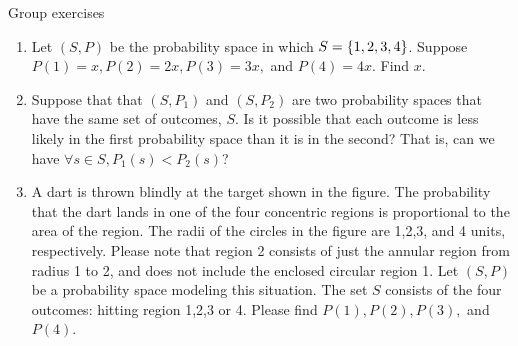 \documentclass[10pt]{beamer}
\begin{document}
\begin{frame}{Group exercises}
\small 
\begin{minipage}{.83\textwidth}
\begin{enumerate}
	\item Let $(S,P)$ be the probability space in which $S=\{ {1,2,3,4} \}$. Suppose $P(1) =x, P(2) = 2x, P(3) = 3x,$ and  $P(4)=4x$.  Find $x$.
	\item Suppose that that $(S,P_1)$  and $(S,P_2)$ are two probability spaces that have the same set of outcomes, $S$.   Is it possible that each outcome is less likely in the first probability space than it is in the second?  That is, can we have $\forall s \in S, P_1(s) < P_2(s)$? 
	\item A dart is thrown blindly at the target shown in the figure. The probability that the dart lands in one of the four concentric regions is proportional to the area of the region.  The radii of the circles in the figure are 1,2,3, and 4 units, respectively. Please note that region 2 consists of just the annular region from radius 1 to 2, and does not include the enclosed circular region 1.    Let $(S,P)$ be a probability space modeling this situation.  The set $S$ consists of the four outcomes: hitting region 1,2,3 or 4.  Please find $P(1), P(2), P(3),$ and $P(4)$.  %
\end{enumerate}
\end{minipage} %
\hfill 
\begin{minipage}{.15\textwidth}
\vspace{4cm}
	\begin{center}
    \end{center}
 
\end{minipage}

\end{frame}
\end{document}
